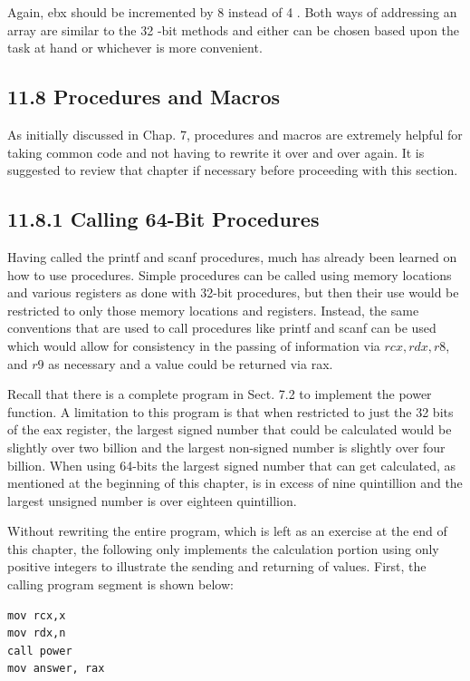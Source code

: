 \documentclass[10pt]{article}
\begin{document}
Again, ebx should be incremented by 8 instead of 4 . Both ways of addressing an array are similar to the 32 -bit methods and either can be chosen based upon the task at hand or whichever is more convenient.

\subsection*{11.8 Procedures and Macros}
As initially discussed in Chap. 7, procedures and macros are extremely helpful for taking common code and not having to rewrite it over and over again. It is suggested to review that chapter if necessary before proceeding with this section.

\subsection*{11.8.1 Calling 64-Bit Procedures}
Having called the printf and scanf procedures, much has already been learned on how to use procedures. Simple procedures can be called using memory locations and various registers as done with 32-bit procedures, but then their use would be restricted to only those memory locations and registers. Instead, the same conventions that are used to call procedures like printf and scanf can be used which would allow for consistency in the passing of information via $r c x, r d x, r 8$, and $r 9$ as necessary and a value could be returned via rax.

Recall that there is a complete program in Sect. 7.2 to implement the power function. A limitation to this program is that when restricted to just the 32 bits of the eax register, the largest signed number that could be calculated would be slightly over two billion and the largest non-signed number is slightly over four billion. When using 64-bits the largest signed number that can get calculated, as mentioned at the beginning of this chapter, is in excess of nine quintillion and the largest unsigned number is over eighteen quintillion.

Without rewriting the entire program, which is left as an exercise at the end of this chapter, the following only implements the calculation portion using only positive integers to illustrate the sending and returning of values. First, the calling program segment is shown below:

\begin{verbatim}
mov rcx,x
mov rdx,n
call power
mov answer, rax
\end{verbatim}
\end{document}
